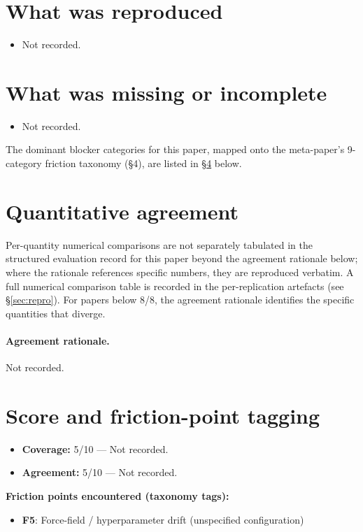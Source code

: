 \documentclass[11pt]{article}
\begin{document}
\section{What was reproduced}
\begin{itemize}
\item Not recorded.
\end{itemize}

\section{What was missing or incomplete}
\begin{itemize}
\item Not recorded.
\end{itemize}
The dominant blocker categories for this paper, mapped onto the meta-paper's 9-category friction taxonomy (\S4), are listed in \S\ref{sec:friction} below.

\section{Quantitative agreement}
Per-quantity numerical comparisons are not separately tabulated in the structured evaluation record for this paper beyond the agreement rationale below; where the rationale references specific numbers, they are reproduced verbatim. A full numerical comparison table is recorded in the per-replication artefacts (see \S\ref{sec:repro}). For papers below 8/8, the agreement rationale identifies the specific quantities that diverge.

\paragraph{Agreement rationale.} Not recorded.

\section{Score and friction-point tagging}\label{sec:friction}
\begin{itemize}
\item \textbf{Coverage:} 5/10 --- Not recorded.
\item \textbf{Agreement:} 5/10 --- Not recorded.
\end{itemize}

\noindent\textbf{Friction points encountered (taxonomy tags):}
\begin{itemize}
\item \textbf{F5}: Force-field / hyperparameter drift (unspecified configuration)
\end{itemize}
\end{document}
